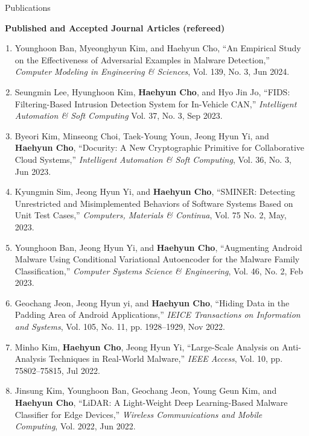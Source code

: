 \documentclass{resume} %
\begin{document}
\begin{rSection}{\faGenderless~Publications}
	\vspace{3mm}
\newpage	
    \strut\textbullet~{\bf Published and Accepted Journal Articles (refereed)}
    \begin{enumerate}[leftmargin=0pt]
    	\item Younghoon Ban, Myeonghyun Kim, and Haehyun Cho,
    	``An Empirical Study on the Effectiveness of Adversarial Examples in Malware Detection,''
    	\emph{Computer Modeling in Engineering \& Sciences},
    	Vol. 139, No. 3, Jun 2024.

    	\item Seungmin Lee, Hyunghoon Kim, \textbf{Haehyun Cho}, and Hyo Jin Jo,
    	``FIDS: Filtering-Based Intrusion Detection System for In-Vehicle CAN,''
    	\emph{Intelligent Automation \& Soft Computing}
    	Vol. 37, No. 3, Sep 2023.

    	\item Byeori Kim, Minseong Choi, Taek-Young Youn, Jeong Hyun Yi, and \textbf{Haehyun Cho},
    	``Docurity: A New Cryptographic Primitive for Collaborative Cloud Systems,''
    	\emph{Intelligent Automation \& Soft Computing},
    	Vol. 36, No. 3, Jun 2023.

    	\item Kyungmin Sim, Jeong Hyun Yi, and \textbf{Haehyun Cho},
    	``SMINER: Detecting Unrestricted and Misimplemented Behaviors of Software Systems Based on Unit Test Cases,''
    	\emph{Computers, Materials \& Continua},
    	Vol. 75 No. 2, May, 2023.

    	\item Younghoon Ban, Jeong Hyun Yi, and \textbf{Haehyun Cho},
    	``Augmenting Android Malware Using Conditional Variational Autoencoder for the Malware Family Classification,''
    	\emph{Computer Systems Science \& Engineering},
    	Vol. 46, No. 2, Feb 2023.

		\item Geochang Jeon, Jeong Hyun yi, and \textbf{Haehyun Cho}, 
		``Hiding Data in the Padding Area of Android Applications,''
		\emph{IEICE Transactions on Information and Systems},
		Vol. 105, No. 11, pp. 1928--1929, Nov 2022.

		\item Minho Kim, \textbf{Haehyun Cho}, Jeong Hyun Yi, 
		``Large-Scale Analysis on Anti-Analysis Techniques in Real-World Malware,''
		\emph{IEEE Access}, 
		Vol. 10,  pp. 75802--75815, Jul 2022.

		\item Jinsung Kim, Younghoon Ban, Geochang Jeon, Young Geun Kim, and \textbf{Haehyun Cho}, 
		``LiDAR: A Light-Weight Deep Learning-Based Malware Classifier for Edge Devices,''
		\emph{Wireless Communications and Mobile Computing}, 
		Vol. 2022, Jun 2022.


\end{enumerate}
\end{rSection}
\end{document}

